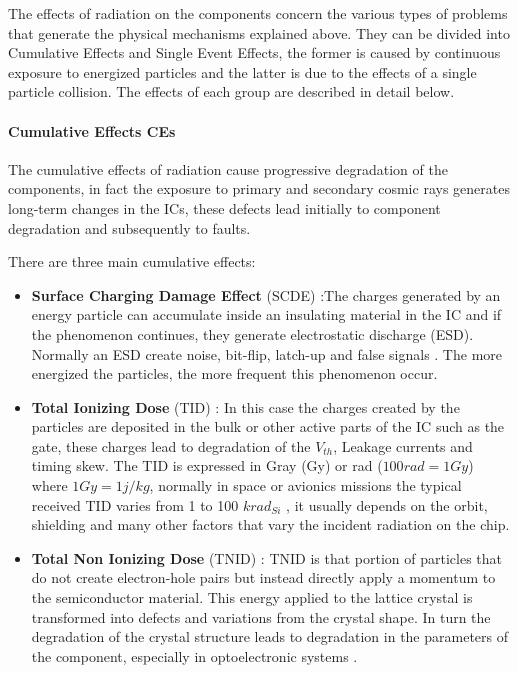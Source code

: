 {{{{				The effects of radiation on the components concern the various types of problems that generate the physical mechanisms explained above. They can be divided into Cumulative Effects and Single Event Effects, the former is caused by continuous exposure to energized particles and the latter is due to the effects of a single particle collision. The effects of each group are described in detail below.
			
				\paragraph{Cumulative Effects CEs}{
					The cumulative effects of radiation cause progressive degradation of the components, in fact the exposure to primary and secondary cosmic rays generates long-term changes in the ICs, these defects lead initially to component degradation and subsequently to faults.
					
					There are three main cumulative effects:
					\begin{itemize}
						\item  \textbf{Surface Charging Damage Effect} (SCDE) :The charges generated by an energy particle can accumulate inside an insulating material in the IC and if the phenomenon continues, they generate electrostatic discharge (ESD). Normally an ESD create noise, bit-flip, latch-up and false signals . The more energized the particles, the more frequent this phenomenon occur.
						
						\item \textbf{Total Ionizing Dose} (TID) : In this case the charges created by the particles are deposited in the bulk or other active parts of the IC such as the gate, these charges lead to degradation of the $V_{th}$, Leakage currents and timing skew. The TID is expressed in Gray (Gy) or rad ($100rad=1Gy$) where $1Gy=1j/kg$, normally in space or avionics missions the typical received TID varies from 1 to 100 $krad_{Si}$ , it usually depends on the orbit, shielding and many other factors that vary the incident radiation on the chip.
						
						\item \textbf{Total Non Ionizing Dose} (TNID) : TNID is that portion of particles that do not create electron-hole pairs but instead directly apply a momentum to the semiconductor material. This energy applied to the lattice crystal is transformed into defects and variations from the crystal shape. In turn the degradation of the crystal structure leads to degradation in the parameters of the component, especially in optoelectronic systems . 
						

\end{itemize}}}}}}
